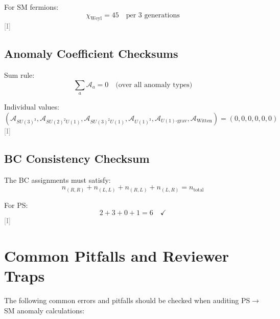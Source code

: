 \documentclass[11pt,a4paper]{article}
\newcommand{\tagI}{\textcolor{gray}{[I]}}
\begin{document}
For SM fermions:
\begin{equation}
\label{eq:checksum-weyl-value}
\chi_{\text{Weyl}} = 45 \quad \text{per 3 generations}
\end{equation}
\tagI

\subsection{Anomaly Coefficient Checksums}

Sum rule:
\begin{equation}
\label{eq:checksum-anomaly}
\sum_a \mathcal{A}_a = 0 \quad \text{(over all anomaly types)}
\end{equation}

Individual values:
\begin{equation}
\label{eq:checksum-values}
(\mathcal{A}_{SU(3)^3}, \mathcal{A}_{SU(2)^2 U(1)}, \mathcal{A}_{SU(3)^2 U(1)}, \mathcal{A}_{U(1)^3}, \mathcal{A}_{U(1)\text{-grav}}, \mathcal{A}_{\text{Witten}}) = (0, 0, 0, 0, 0, 0)
\end{equation}
\tagI

\subsection{BC Consistency Checksum}

The BC assignments must satisfy:
\begin{equation}
\label{eq:bc-checksum}
n_{(R,R)} + n_{(L,L)} + n_{(R,L)} + n_{(L,R)} = n_{\text{total}}
\end{equation}

For PS:
\begin{equation}
\label{eq:bc-ps-check}
2 + 3 + 0 + 1 = 6 \quad \checkmark
\end{equation}
\tagI

\section{Common Pitfalls and Reviewer Traps}
\label{app:pitfalls}

The following common errors and pitfalls should be checked when auditing PS$\to$SM anomaly calculations:
\end{document}
